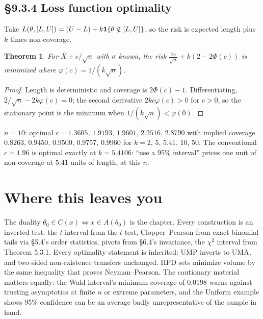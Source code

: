 \documentclass[11pt]{article}
\newtheorem{theorem}{Theorem}[section]
\begin{document}
\subsection{\S9.3.4 Loss function optimality}
Take $L(\theta,[L,U])=(U-L)+k\mathbf 1\{\theta\notin[L,U]\}$, so the risk is expected length plus $k$ times non-coverage.
\begin{theorem}
For $\bar X\pm c/\sqrt n$ with $\sigma$ known, the risk $\frac{2c}{\sqrt n}+k(2-2\Phi(c))$ is minimized where $\varphi(c)=1/(k\sqrt n)$.
\end{theorem}
\begin{proof}
Length is deterministic and coverage is $2\Phi(c)-1$. Differentiating, $2/\sqrt n-2k\varphi(c)=0$; the second derivative $2kc\varphi(c)>0$ for $c>0$, so the stationary point is the minimum when $1/(k\sqrt n)<\varphi(0)$.
\end{proof}
\begin{simbox}
$n=10$: optimal $c=1.3605,\,1.9193,\,1.9601,\,2.2516,\,2.8790$ with implied coverage $0.8263,\,0.9450,\,0.9500,\,0.9757,\,0.9960$ for $k=2,\,5,\,5.41,\,10,\,50$. The conventional $c=1.96$ is optimal exactly at $k=5.4106$: ``use a 95\% interval'' prices one unit of non-coverage at $5.41$ units of length, at this $n$.
\end{simbox}

\section*{Where this leaves you}
The duality $\theta_0\in C(x)\iff x\in A(\theta_0)$ is the chapter. Every construction is an inverted test: the $t$-interval from the $t$-test, Clopper--Pearson from exact binomial tails via \S5.4's order statistics, pivots from \S6.4's invariance, the $\chi^2$ interval from Theorem 5.3.1. Every optimality statement is inherited: UMP inverts to UMA, and two-sided non-existence transfers unchanged. HPD sets minimize volume by the same inequality that proves Neyman--Pearson. The cautionary material matters equally: the Wald interval's minimum coverage of $0.0198$ warns against trusting asymptotics at finite $n$ or extreme parameters, and the Uniform example shows 95\% confidence can be an average badly unrepresentative of the sample in hand.
\end{document}
